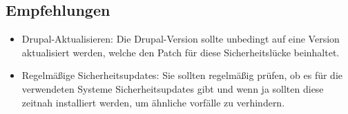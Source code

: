 \subsection*{Empfehlungen}
\begin{itemize}
    \item Drupal-Aktualisieren: Die Drupal-Version sollte unbedingt auf eine Version aktualisiert werden, welche den Patch für diese Sicherheitslücke beinhaltet.
    \item Regelmäßige Sicherheitsupdates: Sie sollten regelmäßig prüfen, ob es für die verwendeten Systeme Sicherheitsupdates gibt und wenn ja sollten diese zeitnah installiert werden, um ähnliche vorfälle zu verhindern.
\end{itemize}